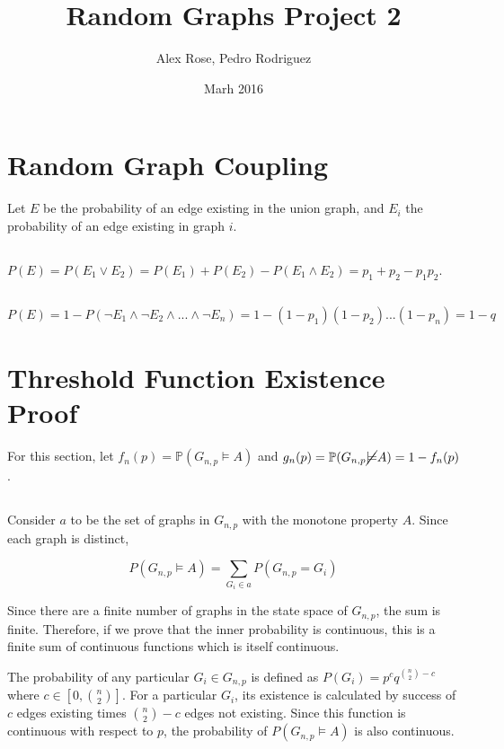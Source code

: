 \documentclass{article}
\title{Random Graphs Project 2}
\author{Alex Rose, Pedro Rodriguez}
\date{Marh 2016}
\begin{document}
\maketitle

\section{Random Graph Coupling}

Let $E$ be the probability of an edge existing in the union graph, and $E_i$ the probability of an edge existing in graph $i$.

\subsection{}
$P(E) = P(E_1 \lor E_2) = P(E_1) + P(E_2) - P(E_1 \land E_2) = p_1 + p_2 -p_1p_2$.

\subsection{}
$P(E) = 1 - P(\neg E_1 \land \neg E_2 \land ... \land \neg E_n) = 1 - (1-p_1)(1-p_2)...(1-p_n) = 1 - q$ 


\section{Threshold Function Existence Proof}

For this section, let $f_n(p) = \mathbb{P}(G_{n,p} \models A)$ and $g_n(p) = \mathbb{P}(G_{n,p} \cancel{\models} A) = 1 - f_n(p)$.

\subsection{}
Consider $a$ to be the set of graphs in $G_{n,p}$ with the monotone property $A$. Since each graph is distinct,

$$P(G_{n,p}\vDash A)=\sum_{G_i\in a} P(G_{n,p}=G_i)$$

Since there are a finite number of graphs in the state space of $G_{n,p}$, the sum is finite. Therefore, if we prove that the inner probability is continuous, this is a finite sum of continuous functions which is itself continuous.

The probability of any particular $G_i\in G_{n,p}$ is defined as $P(G_i)=p^{c}q^{{n\choose 2}-c}$ where $c\in [0,{n\choose 2}]$. For a particular $G_i$, its existence is calculated by success of $c$ edges existing times ${n\choose 2}-c$ edges not existing. Since this function is continuous with respect to $p$, the probability of $P(G_{n,p}\vDash A)$ is also continuous.
\end{document}
